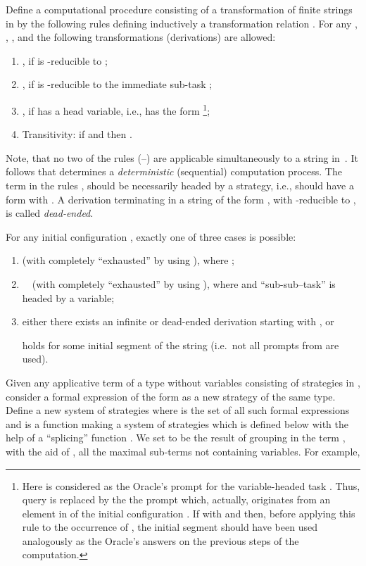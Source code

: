 \documentclass[fleqn]{LMCS}
\theoremstyle{plain}\newtheorem{satz}[thm]{Satz}
\theoremstyle{plain}\newtheorem{hyp}[thm]{Hypothesis}
\theoremstyle{plain}\newtheorem{hyps}[thm]{Hypotheses}
\theoremstyle{definition}\newtheorem{note}[thm]{Note}
\newcommand{\?}{\mbox{?}}
\begin{document}
Define a computational procedure 
consisting of a transformation of finite strings in  
by the following rules defining inductively a transformation relation 
. For any , 
, , and  the 
following transformations (derivations) are allowed: 
\begin{enumerate}[(1)]
\item , if  is -reducible to ; 
\item , if  is -reducible to the immediate sub-task ; 
\item , if  has a head variable, i.e., has the 
form \footnote{Here  is considered as the Oracle's prompt for the 
variable-headed task . 
Thus, query  is replaced by the the prompt  which, actually, originates 
from an element in  of the initial configuration . 
If  with  and  then, before applying this 
rule to the occurrence of , 
the initial segment  should have been used analogously as the Oracle's 
answers on the previous steps of the computation. 
}; 
\item Transitivity: if  and  then 
. 
\end{enumerate}
Note, that no two of the rules (--) are applicable 
simultaneously to a string in~. It follows that  
determines a \emph{deterministic} (sequential) computation process. 
The term  in the rules ,  should be necessarily 
headed by a strategy, i.e., should have a form 
 with .
A derivation terminating in a string of the form , 
with  -reducible to , is called 
\emph{dead-ended}. 

For any initial configuration 
, 
exactly one 
of three cases is possible:
\begin{enumerate}[(\rlap{}1)]
\item  (with  completely ``exhausted'' by using ), 
where ; 
\item  \ \ 
(with  completely ``exhausted'' by using ), where  and 
``sub-sub--task''  is headed by a variable; 
\item either there exists an infinite or dead-ended derivation starting with 
, or 
 
holds for some initial segment  of the string  
(i.e.\ not all prompts from  are used). 
\end{enumerate}
Given any applicative term  of a type  without variables 
consisting of strategies in , 
consider a formal expression of the form  as a new strategy 
of the same type. 
Define a new system of strategies  where 
 is the set of all such formal expressions  
 and  is a function 
making  a system of strategies which is defined below 
with the help of a ``splicing'' function 
. 
We set  to be the result of grouping in the term 
, with the aid of , all the maximal sub-terms 
not containing variables. For example, 
\end{document}
